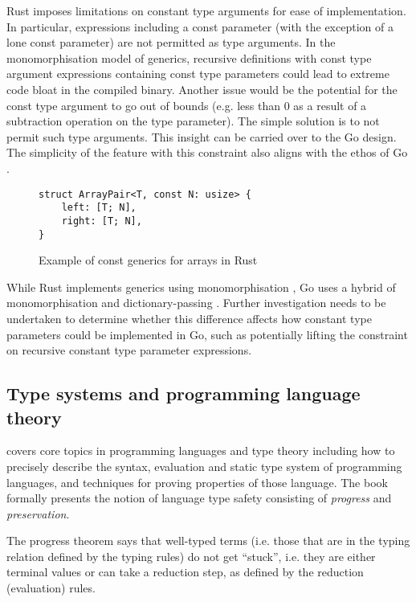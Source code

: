 Rust imposes limitations on constant type arguments for ease of implementation.
In particular, expressions including a const parameter (with the exception of a
lone const parameter) are not permitted as type arguments. In the
monomorphisation model of generics, recursive definitions with const type
argument expressions containing const type parameters could lead to extreme code
bloat in the compiled binary. Another issue would be the potential for the const
type argument to go out of bounds (e.g. less than 0 as a result of a subtraction
operation on the type parameter). The simple solution is to not permit such type
arguments. This insight can be carried over to the Go design. The simplicity of
the feature with this constraint also aligns with the ethos of Go
\autocite{goSimplicity}.


\begin{figure}
    \begin{lstlisting}
struct ArrayPair<T, const N: usize> {
    left: [T; N],
    right: [T; N],
}
\end{lstlisting}
    \caption{Example of const generics for arrays in Rust \autocite{rustConstBlog}}
\end{figure}


While Rust implements generics using monomorphisation
\autocite{rustCompilerGuide}, Go uses a hybrid of monomorphisation and
dictionary-passing \autocite{generics1.18}. Further investigation needs to be
undertaken to determine whether this difference affects how constant type
parameters could be implemented in Go, such as potentially lifting the
constraint on recursive constant type parameter expressions.

\subsection{Type systems and programming language theory}

\textcite{tapl} covers core topics in programming languages and type theory
including how to precisely describe the syntax, evaluation and static type
system of programming languages, and techniques for proving properties of those
language. The book formally presents the notion of language type safety
consisting of \emph{progress} and \emph{preservation}.

The progress theorem says that well-typed terms (i.e. those that are in the
typing relation defined by the typing rules) do not get ``stuck'', i.e. they are
either terminal values or can take a reduction step, as defined by the reduction
(evaluation) rules.

